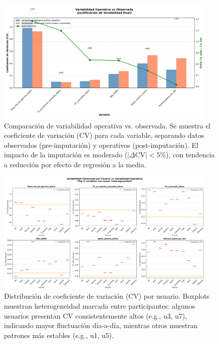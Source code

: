 \documentclass[12pt,letterpaper,twoside]{report}
\begin{document}
\begin{figure}[htbp]
\centering
\includegraphics[width=0.95\textwidth]{../analisis_u/variabilidad_dual/plots_consolidados/variabilidad_operativa_vs_observada.png}
\caption{Comparación de variabilidad operativa vs. observada. Se muestra el coeficiente de variación (CV) para cada variable, separando datos observados (pre-imputación) y operativos (post-imputación). El impacto de la imputación es moderado ($|\Delta\text{CV}| < 5\%$), con tendencia a reducción por efecto de regresión a la media.}
\label{fig:variabilidad_operativa_vs_observada}
\end{figure}

\begin{figure}[htbp]
\centering
\includegraphics[width=0.95\textwidth]{../analisis_u/variabilidad_dual/plots_consolidados/variabilidad_por_usuario_boxplot.png}
\caption{Distribución de coeficiente de variación (CV) por usuario. Boxplots muestran heterogeneidad marcada entre participantes: algunos usuarios presentan CV consistentemente altos (e.g., u3, u7), indicando mayor fluctuación día-a-día, mientras otros muestran patrones más estables (e.g., u1, u5).}
\label{fig:variabilidad_por_usuario}
\end{figure}
\end{document}
